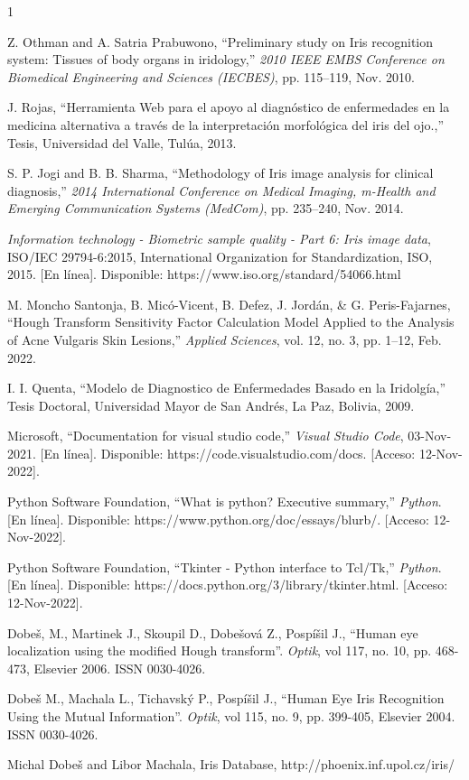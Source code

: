 \documentclass[12pt]{article}
\begin{document}
\newpage
\vspace*{0.1cm}

\begin{thebibliography}{1}


Z. Othman and A. Satria Prabuwono, “Preliminary study on Iris recognition system: Tissues of body organs in iridology,” \emph{2010 IEEE EMBS Conference on Biomedical Engineering and Sciences (IECBES)}, pp. 115–119, Nov. 2010.

J. Rojas, “Herramienta Web para el apoyo al diagnóstico de enfermedades en la medicina alternativa a través de la interpretación morfológica del iris del ojo.,” Tesis, Universidad del Valle, Tulúa, 2013.

S. P. Jogi and B. B. Sharma, “Methodology of Iris image analysis for clinical diagnosis,” \emph{2014 International Conference on Medical Imaging, m-Health and Emerging Communication Systems (MedCom)}, pp. 235–240, Nov. 2014.

\emph{Information technology - Biometric sample quality - Part 6: Iris image data}, ISO/IEC 29794-6:2015, International Organization for Standardization, ISO, 2015. [En línea]. Disponible: https://www.iso.org/standard/54066.html

M. Moncho Santonja, B. Micó-Vicent, B. Defez, J. Jordán, \& G. Peris-Fajarnes, “Hough Transform Sensitivity Factor Calculation Model Applied to the Analysis of Acne Vulgaris Skin Lesions,” \emph{Applied Sciences}, vol. 12, no. 3, pp. 1–12, Feb. 2022.

I. I. Quenta, “Modelo de Diagnostico de Enfermedades Basado en la Iridolgía,” Tesis Doctoral, Universidad Mayor de San Andrés, La Paz, Bolivia, 2009.

Microsoft, “Documentation for visual studio code,” \emph{Visual Studio Code}, 03-Nov-2021. [En línea]. Disponible: https://code.visualstudio.com/docs. [Acceso: 12-Nov-2022].

Python Software Foundation, “What is python? Executive summary,” \emph{Python}. [En línea]. Disponible: https://www.python.org/doc/essays/blurb/. [Acceso: 12-Nov-2022].

Python Software Foundation, “Tkinter - Python interface to Tcl/Tk,” \emph{Python}. [En línea]. Disponible: https://docs.python.org/3/library/tkinter.html. [Acceso: 12-Nov-2022].

Dobeš, M., Martinek J., Skoupil D., Dobešová Z.,  Pospíšil J., “Human eye localization using the modified Hough transform”. \emph{Optik}, vol 117, no. 10, pp. 468-473, Elsevier 2006. ISSN 0030-4026.

Dobeš M., Machala L., Tichavský P., Pospíšil J., “Human Eye Iris Recognition Using the Mutual Information”. \emph{Optik}, vol 115, no. 9, pp. 399-405, Elsevier 2004. ISSN 0030-4026.

Michal Dobeš and Libor Machala, Iris Database, http://phoenix.inf.upol.cz/iris/

\end{thebibliography}
\end{document}
